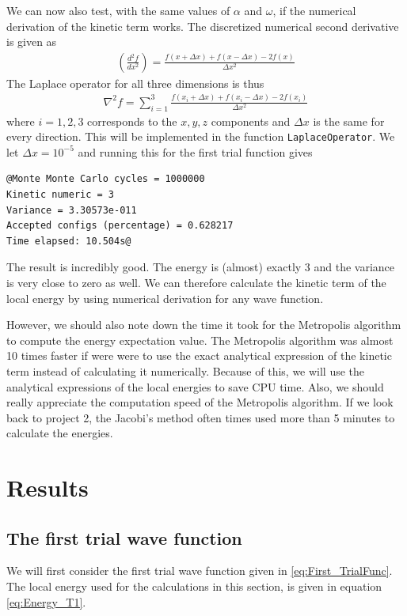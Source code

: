 \documentclass[12pt]{article}
\begin{document}
We can now also test, with the same values of $\alpha$ and $\omega$, if the numerical derivation of the kinetic term works. The discretized numerical second derivative is given as
\begin{align*}
\left(\frac{d^2f}{dx^2}\right) = \frac{f(x + \Delta x) + f(x - \Delta x) - 2f(x)}{\Delta x^2}
\end{align*}
The Laplace operator for all three dimensions is thus
\begin{align*}
\nabla^2 f = \displaystyle \sum_{i=1}^3 \frac{f(x_i + \Delta x) + f(x_i - \Delta x) - 2f(x_i)}{\Delta x^2} 
\end{align*}
where $i=1,2,3$ corresponds to the $x,y,z$ components and $\Delta x$ is the same for every direction. This will be implemented in the function \texttt{LaplaceOperator}. We let $\Delta x = 10^{-5}$ and running this for the first trial function gives
\begin{lstlisting}
@Monte Monte Carlo cycles = 1000000
Kinetic numeric = 3
Variance = 3.30573e-011
Accepted configs (percentage) = 0.628217
Time elapsed: 10.504s@
\end{lstlisting}
The result is incredibly good. The energy is (almost) exactly 3 and the variance is very close to zero as well. We can therefore calculate the kinetic term of the local energy by using numerical derivation for any wave function.

However, we should also note down the time it took for the Metropolis algorithm to compute the energy expectation value. The Metropolis algorithm was almost 10 times faster if were were to use the exact analytical expression of the kinetic term instead of calculating it numerically. Because of this, we will use the analytical expressions of the local energies to save CPU time. Also, we should really appreciate the computation speed of the Metropolis algorithm. If we look back to project 2, the Jacobi's method often times used more than  5 minutes to calculate the energies.

\section{Results}\label{section:results}
\subsection{The first trial wave function}
We will first consider the first trial wave function given in \ref{eq:First_TrialFunc}. The local energy used for the calculations in this section, is given in equation \ref{eq:Energy_T1}.
\end{document}

